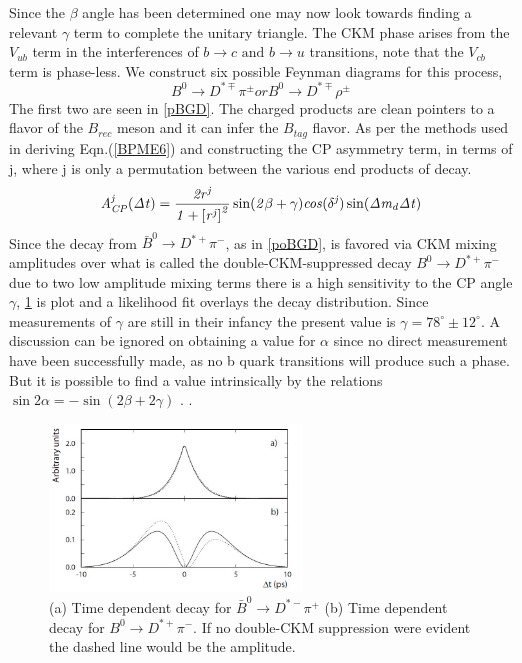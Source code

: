 Since the $\beta$ angle has been determined one may now look towards finding a relevant $\gamma$ term to complete the unitary triangle. The CKM phase arises from the $V_{ub}$ term in the interferences of $b\rightarrow c \mbox{ and } b \rightarrow u$ transitions, note that the $V_{cb}$ term is phase-less. We construct six possible Feynman diagrams for this process,
\begin{equation}\label{BPME22}
B^0 \rightarrow D^{*\mp}\pi^{\pm} or B^0 \rightarrow D^{*\mp}\rho^{\pm} 
\end{equation}
The first two are seen in \cref{pBGD}. The charged products are clean pointers to a flavor of the $B_{rec}$ meson and it can infer the $B_{tag}$ flavor. As per the methods used in deriving Eqn.(\ref{BPME6}) and constructing the CP asymmetry term, in terms of j, where j is only a permutation between the various end products of decay.
\begin{equation}\label{BPME23}
\it{A}^{j}_{\it{CP}}(\Delta t) = \frac{2r^j}{1+\left[r^j\right]^2}\sin(2 \beta +\gamma)cos(\delta^j)\sin(\Delta m_d \Delta t)
\end{equation}
Since the decay \cite{B7} from $\bar{B}^0 \rightarrow D^{*+}\pi^{-}$, as in \cref{poBGD}, is favored via CKM mixing amplitudes over what is called the double-CKM-suppressed decay $B^0 \rightarrow D^{*+}\pi^{-}$ due to two low amplitude mixing terms there is a high sensitivity to the CP angle $\gamma$, \cref{kino1} is plot and a likelihood fit overlays the decay distribution. Since measurements of $\gamma$ are still in their infancy the present value is $\gamma = 78^{\circ}\pm12^{\circ}$. A discussion can be ignored on obtaining a value for $\alpha$ since no direct measurement have been successfully made, as no b quark transitions will produce such a phase. But it is possible to find a value intrinsically by the relations $\sin2\alpha = - \sin(2\beta +2\gamma)$ .\cite{B17} .

 \begin{figure}[h]
\centering
\includegraphics[width=0.6\textwidth]{figs/kino.JPG}
\caption{(a) Time dependent decay for $\bar{B}^0 \rightarrow D^{*-}\pi^{+}$ (b) Time dependent decay for $B^0 \rightarrow D^{*+}\pi^{-}$. If no double-CKM suppression were evident the dashed line would be the amplitude.}
\label{kino1}
\end{figure}

